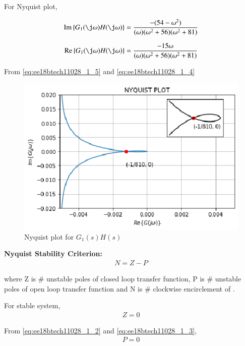 \begin{enumerate}[label=\thesection.\arabic*.,ref=\thesection.\theenumi]
For Nyquist plot, 

\begin{align}
    \text{Im} \cbrak{G_{1}(\j \omega)H(\j \omega)}= \frac{-(54 - \omega^{2})}{(\omega)(\omega^{2}+56)(\omega^{2} + 81)}
    \label{eq:ee18btech11028_1_5}
\end{align}


\begin{align}
    \text{Re} \cbrak{G_{1}(\j \omega)H(\j \omega)}= \frac{-15 \omega}{(\omega)(\omega^{2}+56)(\omega^{2} + 81)}
    \label{eq:ee18btech11028_1_4}
\end{align}

From \ref{eq:ee18btech11028_1_5} and \ref{eq:ee18btech11028_1_4}

\begin{figure}[!h]
\includegraphics[width=\columnwidth]{./figs/ee18btech11028/ee18btech11028_1.eps}
    \centering
  \caption{Nyquist plot for $G_{1}(s)H(s)$}
  \label{fig:ee18btech11028_2_fig1}
\end{figure}


\textbf{Nyquist Stability Criterion:}
\begin{align}
    N = Z - P
\end{align}

where Z is \# unstable poles of closed loop transfer function, P is \# unstable poles of open loop transfer function
and N is \# clockwise encirclement of .

For stable system, 
\begin{align}
    Z = 0
\end{align}

From \ref{eq:ee18btech11028_1_2} and \ref{eq:ee18btech11028_1_3},
\begin{align}
    P = 0
\end{align}


\end{enumerate}
